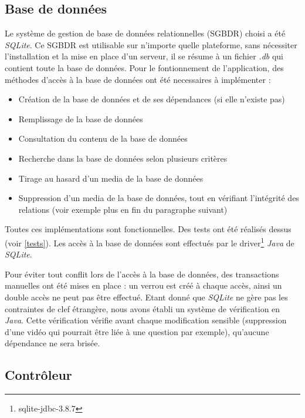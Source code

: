 \subsection{Base de données}\label{BDD}

Le système de gestion de base de données relationnelles (SGBDR) choisi a été \textit{SQLite}. Ce SGBDR est utilisable sur n'importe quelle plateforme, sans nécessiter l'installation et la mise en place d'un serveur, il se résume à un fichier \textit{.db} qui contient toute la base de données.
Pour le fontionnement de l'application, des méthodes d'accès à la base de données ont été necessaires à implémenter :


\begin{itemize}
 \item Création de la base de données et de ses dépendances (si elle n'existe pas)
 \item Remplissage de la base de données
 \item Consultation du contenu de la base de données
 \item Recherche dans la base de données selon plusieurs critères
 \item Tirage au hasard d'un media de la base de données
 \item Suppression d'un media de la base de données, tout en vérifiant l'intégrité des relations (voir exemple plus en fin du paragraphe suivant)
\end{itemize}


Toutes ces implémentations sont fonctionnelles. Des tests ont été réalisés dessus (voir \ref{tests}).
Les accès à la base de données sont effectués par le driver\footnote{sqlite-jdbc-3.8.7} \textit{Java} de \textit{SQLite}.

Pour éviter tout conflit lors de l'accès à la base de données, des transactions manuelles ont été mises en place : un verrou est créé à chaque accès, ainsi un double accès ne peut pas être effectué.
Etant donné que \textit{SQLite} ne gère pas les contraintes de clef étrangère, nous avons établi un système de vérification en \textit{Java}. Cette vérification vérifie avant chaque modification sensible (suppression d'une vidéo qui pourrait être liée à une question par exemple), qu'aucune dépendance ne sera brisée.


\subsection{Contrôleur}\label{controller}


